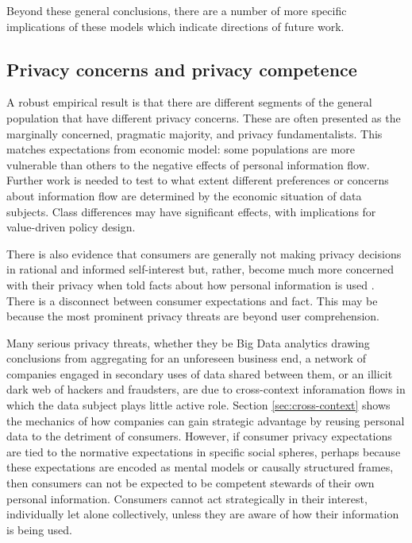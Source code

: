 \documentclass[../thesis.tex]{subfiles}
\begin{document}
Beyond these general conclusions, there are a number
of more specific implications of these models which
indicate directions of future work.

\subsection{Privacy concerns and privacy competence}

A robust empirical result is that there are
different segments of the general population that have different
privacy concerns.
These are often presented as the marginally concerned, pragmatic majority,
and privacy fundamentalists.
\cite{ackerman1999privacy} \cite{berendt2005privacy}
\cite{sheehan2002toward}
This matches expectations from economic model:
some populations are more vulnerable than others to the
negative effects of personal information flow.
Further work is needed to test to what extent
different preferences or concerns about information
flow are determined by the economic situation
of data subjects.
Class differences may have significant effects,
with implications for value-driven policy design.

There is also evidence that consumers are generally not making
privacy decisions in rational and informed
self-interest but, rather,
become much more concerned with their privacy
when told facts
about how personal information is
used \cite{hoofnagle2014alan}.
There is a disconnect between consumer
expectations and fact.
This may be because the most prominent
privacy threats are beyond user comprehension.

Many serious privacy threats, whether they be Big
Data analytics drawing conclusions from
aggregating for an unforeseen business end,
a network of companies engaged in secondary uses of data
shared between them, or an illicit dark web of hackers
and fraudsters, are due to cross-context inforamation
flows in which the data subject plays little active role.
Section \ref{sec:cross-context} shows the mechanics
of how companies can gain strategic advantage by
reusing personal data to the detriment of consumers.
However, if consumer privacy expectations are tied to
the normative expectations in specific social spheres,
perhaps because these expectations are encoded as mental
models or causally structured frames, then consumers
can not be expected to be competent stewards of their
own personal information.
Consumers cannot act strategically in their interest,
individually let alone collectively, unless they
are aware of how their information is being used.
\end{document}
